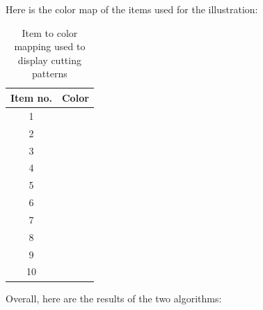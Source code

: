 \documentclass[a4paper]{article}
\begin{document}
    \pagebreak
    \noindent
    Here is the color map of the items used for the illustration:

    \begin{table}[h!]
        \centering
        \renewcommand{\arraystretch}{1.5} %
        \setlength{\tabcolsep}{10pt}     %
        \begin{tabular}{|c|>{\centering\arraybackslash}m{2cm}|}
            \hline
            \rowcolor{gray!30} \textbf{Item no.} & \textbf{Color} \\
            \hline
            1 & \cellcolor[rgb]{1,0,0} \\
            2 & \cellcolor[rgb]{1,0.231,0} \\
            3 & \cellcolor[rgb]{1,0.486,0} \\
            4 & \cellcolor[rgb]{1,0.741,0} \\
            5 & \cellcolor[rgb]{0.984,0.961,0} \\
            6 & \cellcolor[rgb]{0.769,1,0} \\
            7 & \cellcolor[rgb]{0.514,1,0} \\
            8 & \cellcolor[rgb]{0.282,1,0} \\
            9 & \cellcolor[rgb]{0.027,1,0} \\
            10& \cellcolor[rgb]{0,1,0.224} \\
            \hline
        \end{tabular}
        \caption{Item to color mapping used to display cutting patterns}
        \label{tab:rgb_colors}
    \end{table}

    \noindent Overall, here are the results of the two algorithms:\\
    
\end{document}
